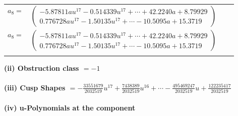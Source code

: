 \documentclass[1p]{elsarticle_modified}
\theoremstyle{definition}
\begin{document}
\begin{tabular}{m{7pt} m{180pt} m{7pt} m{180pt} }
\flushright $a_{8}=$&$\begin{pmatrix}-5.87811 a u^{17}-0.514339 u^{17}+\cdots+42.2240 a+8.79929\\0.776728 a u^{17}-1.50135 u^{17}+\cdots-10.5095 a+15.3719\end{pmatrix}$\\ \flushright $a_{8}=$&$\begin{pmatrix}-5.87811 a u^{17}-0.514339 u^{17}+\cdots+42.2240 a+8.79929\\0.776728 a u^{17}-1.50135 u^{17}+\cdots-10.5095 a+15.3719\end{pmatrix}$\\&\end{tabular}
\flushleft \textbf{(ii) Obstruction class $= -1$}\\~\\
\flushleft \textbf{(iii) Cusp Shapes $= -\frac{33551679}{2032519} u^{17}+\frac{7438389}{2032519} u^{16}+\cdots-\frac{495469247}{2032519} u+\frac{122235417}{2032519}$}\\~\\
\newpage\renewcommand{\arraystretch}{1}
\flushleft \textbf{(iv) u-Polynomials at the component}\newline \\
\end{document}
